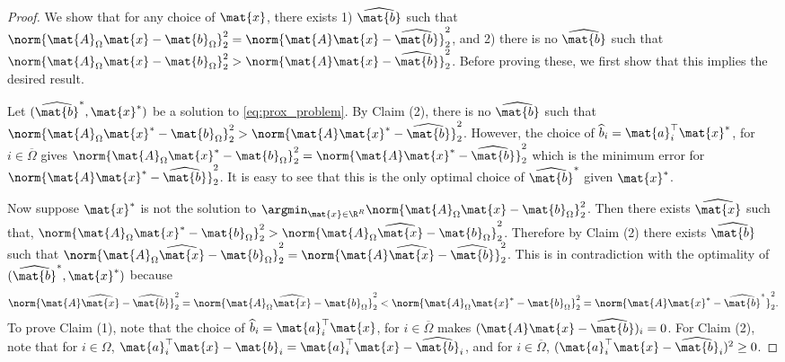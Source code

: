 \begin{proof}
We show that for any choice of $\mat{x}$, there exists 1) $\widehat{\mat{b}}$ such that $\norm{\mat{A}_{\Omega} \mat{x} - \mat{b}_{\Omega}}_{2}^2 = \norm{\mat{A} \mat{x} - \widehat{\mat{b}}}_2^2$, and 2) there is no $\widehat{\mat{b}}$ such that $\norm{\mat{A}_{\Omega} \mat{x} - \mat{b}_{\Omega}}_{2}^2 > \norm{\mat{A} \mat{x} - \widehat{\mat{b}}}_2^2$. Before proving these, we first show that this implies the desired result.

Let $(\widehat{\mat{b}}^*, \mat{x}^*)$ be a solution to \eqref{eq:prox_problem}. By Claim (2), there is no $\widehat{\mat{b}}$ such that $\norm{\mat{A}_{\Omega} \mat{x}^* - \mat{b}_{\Omega}}_{2}^2 > \norm{\mat{A} \mat{x}^* - \widehat{\mat{b}}}_2^2$. However, the choice of $\widehat{b}_i = \mat{a}_i^\top \mat{x}^*$, for $i\in\overline{\Omega}$ gives $\norm{\mat{A}_{\Omega} \mat{x}^* - \mat{b}_{\Omega}}_{2}^2 = \norm{\mat{A} \mat{x}^* - \widehat{\mat{b}}}_2^2$ which is the minimum error for $\norm{\mat{A} \mat{x}^* - \widehat{\mat{b}}}_2^2$. It is easy to see that this is the only optimal choice of $\widehat{\mat{b}}^*$ given $\mat{x}^*$.

Now suppose $\mat{x}^*$ is not the solution to $\argmin_{\mat{x}\in\R^R} \norm{\mat{A}_{\Omega} \mat{x} - \mat{b}_{\Omega}}_{2}^2$. Then there exists $\widehat{\mat{x}}$ such that, $\norm{\mat{A}_{\Omega} \mat{x}^* - \mat{b}_{\Omega}}_{2}^2 > \norm{\mat{A}_{\Omega} \widehat{\mat{x}} - \mat{b}_{\Omega}}_{2}^2$. Therefore by Claim (2) there exists $\widehat{\mat{b}}$ such that $\norm{\mat{A}_{\Omega} \widehat{\mat{x}} - \mat{b}_{\Omega}}_{2}^2 = \norm{\mat{A} \widehat{\mat{x}} - \widehat{\mat{b}}}_2^2$. This is in contradiction with the optimality of $(\widehat{\mat{b}}^*, \mat{x}^*)$ because
\begin{align}
\norm{\mat{A} \widehat{\mat{x}} - \widehat{\mat{b}}}_2^2 = \norm{\mat{A}_{\Omega} \widehat{\mat{x}} - \mat{b}_{\Omega}}_{2}^2 < \norm{\mat{A}_{\Omega} \mat{x}^* - \mat{b}_{\Omega}}_{2}^2 = \norm{\mat{A} \mat{x}^* - \widehat{\mat{b}}^*}_{2}^2.
\end{align}
To prove Claim (1), note that the choice of $\widehat{b}_i = \mat{a}_i^\top \mat{x}$, for $i\in\overline{\Omega}$ makes $(\mat{A} \mat{x} - \widehat{\mat{b}})_i=0$. For Claim (2), note that for $i\in\Omega$, $\mat{a}_i^\top \mat{x} - \mat{b}_i = \mat{a}_i^\top \mat{x} - \widehat{\mat{b}}_i$, and for $i\in\overline{\Omega}$, $(\mat{a}_i^\top \mat{x} - \widehat{\mat{b}}_i)^2 \geq 0$.
\end{proof}

